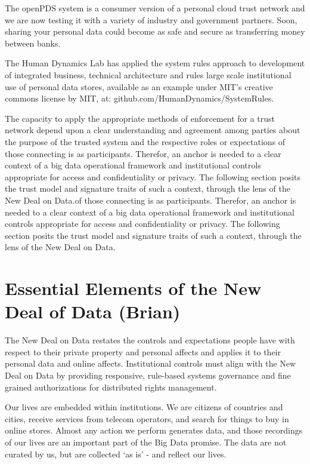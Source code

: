 The openPDS system is a consumer version of a personal cloud trust network and we are now testing it with a variety of industry and government partners.
Soon, sharing your personal data could become as safe and secure as transferring money between banks.

The Human Dynamics Lab has applied the system rules approach to development of integrated business, technical architecture and rules large scale institutional use of personal data stores, available as an example under MIT's creative commons license by MIT, at: github.com/HumanDynamics/SystemRules. 

The capacity to apply the appropriate methods of enforcement for a trust network depend upon a clear understanding and agreement among parties about the purpose of the trusted system and the respective roles or expectations of those connecting is as participants.
Therefor, an anchor is needed to a clear context of a big data operational framework and institutional controls appropriate for access and confidentiality or privacy.
The following section posits the trust model and signature traits of such a context, through the lens of the New Deal on Data.of those connecting is as participants.
Therefor, an anchor is needed to a clear context of a big data operational framework and institutional controls appropriate for access and confidentiality or privacy.
The following section posits the trust model and signature traits of such a context, through the lens of the New Deal on Data.

\section{Essential Elements of the New Deal of Data (Brian)}

The New Deal on Data restates the controls and expectations people have with respect to their private property and personal affects and applies it to their personal data and online affects. Institutional controls must align with the New Deal on Data by providing responsive, rule-based systems governance and fine grained authorizations for distributed rights management.

Our lives are embedded within institutions.
We are citizens of countries and cities, receive services from telecom operators, and search for things to buy in online stores.
Almost any action we perform generates data, and those recordings of our lives are an important part of the Big Data promise.
The data are not curated by us, but are collected `as is' - and reflect our lives.

